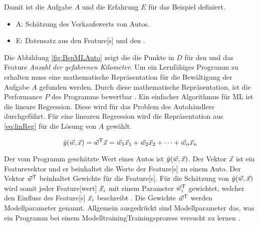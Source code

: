 Damit ist die Aufgabe \(A\) und die Erfahrung \(E\) für das Beispiel definiert. 

\begin{itemize}
    \item A: Schätzung des Verkaufswerts von Autos.
    \item E: Datensatz aus den \gls{Feature}[s] und den .
\end{itemize}


Die Abbildung \ref{fig:BspMLAuto} zeigt die die Punkte in \(D\) für den  und das \gls{Feature} \textit{Anzahl der gefahrenen Kilometer}. Um ein Lernfähiges Programm zu erhalten muss eine mathematische Repräsentation für die Bewältigung der Aufgabe \(A\) gefunden werden. Durch diese mathematische Repräsentation, ist die Performance \(P\) des Programms bewertbar \cite{Mitchell.1997}. Ein einfacher Algorithmus für \gls{ML} ist die lineare Regression. Diese wird für das Problem des Autohändlers durchgeführt. Für eine linearen Regression wird die Repräsentation aus \ref{eq:linReg} für die Lösung von \(A\) gewählt.

\begin{equation}
    \label{eq:linReg}
    \hat{y}(\vec{w}, \vec{x}) =  \vec{w}^\mathrm{T}\vec{x} = \vec{w}_1\vec{x}_1 + \vec{w}_2\vec{x}_2 + \dots + \vec{w}_n\vec{x}_n
\end{equation}

Der vom Programm geschätzte Wert eines Autos ist \(\hat{y}(\vec{w}, \vec{x})\). Der Vektor \(\vec{x}\) ist ein \gls{Featurevektor} und er beinhaltet die Werte der \gls{Feature}[s] zu einem Auto. Der Vektor \(\vec{w}^\mathrm{T}\) beinhaltet Gewichte für die \gls{Feature}[s]. Für die Schätzung von \(\hat{y}(\vec{w}, \vec{x})\) wird somit jeder \gls{Feature}[wert] \(\vec{x}_i\) mit einem Parameter \(\vec{w}^\mathrm{T}_i\) gewichtet, welcher den Einfluss des \gls{Feature}[s] \(\vec{x}_i\) beschreibt \cite{Goodfellow.2016}. Die Gewichte \(\vec{w}^\mathrm{T}\) werden \gls{Modellparameter} genannt. Allgemein ausgedrückt sind \gls{Modellparameter} das, was ein Programm bei einem \gls{Modelltraining}{Trainingsprozess} versucht zu lernen \cite{Zheng.2015}. \par

